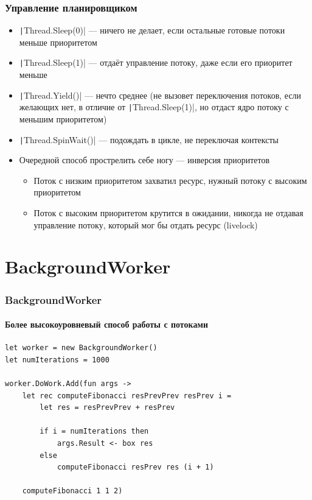 \documentclass[xetex,mathserif,serif]{beamer}
\begin{document}
	\begin{frame}
		\frametitle{Управление планировщиком}
		\begin{small}
			\begin{itemize}
				\item \texttt|Thread.Sleep(0)| --- ничего не делает, если остальные готовые потоки меньше приоритетом
				\item \texttt|Thread.Sleep(1)| --- отдаёт управление потоку, даже если его приоритет меньше
				\item \texttt|Thread.Yield()| --- нечто среднее (не вызовет переключения потоков, если желающих нет, в отличие от \texttt|Thread.Sleep(1)|, но отдаст ядро потоку с меньшим приоритетом)
				\item \texttt|Thread.SpinWait()| --- подождать в цикле, не переключая контексты
				\item Очередной способ прострелить себе ногу --- инверсия приоритетов
				\begin{itemize}
					\item Поток с низким приоритетом захватил ресурс, нужный потоку с высоким приоритетом
					\item Поток с высоким приоритетом крутится в ожидании, никогда не отдавая управление потоку, который мог бы отдать ресурс (livelock)
				\end{itemize}
			\end{itemize}
		\end{small}
	\end{frame}

	\section{BackgroundWorker}

	\begin{frame}[fragile]
		\frametitle{BackgroundWorker}
		\framesubtitle{Более высокоуровневый способ работы с потоками}
		\begin{verbatim}
let worker = new BackgroundWorker()
let numIterations = 1000

worker.DoWork.Add(fun args ->
    let rec computeFibonacci resPrevPrev resPrev i =
        let res = resPrevPrev + resPrev
        
        if i = numIterations then
            args.Result <- box res
        else
            computeFibonacci resPrev res (i + 1)

    computeFibonacci 1 1 2)
		\end{verbatim}
\end{frame}
\end{document}
